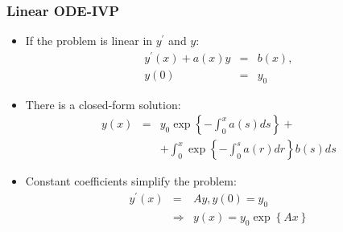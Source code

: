 \documentclass[bigger,handout]{beamer}
\begin{document}
\begin{frame}%
  
\frametitle{Linear ODE-IVP}

\begin{itemize}
\item If the problem is linear in $y^{\prime }$ and $y$:%
\begin{eqnarray*}
y^{\prime }\left( x\right) +a\left( x\right) y &=&b\left( x\right) , \\
y\left( 0\right) &=&y_{0}
\end{eqnarray*}

\item There is a closed-form solution:%
\begin{eqnarray*}
y\left( x\right) &=&y_{0}\exp \left\{ -\int_{0}^{x}a\left( s\right)
ds\right\} + \\
&&+\int_{0}^{x}\exp \left\{ -\int_{0}^{s}a\left( r\right) dr\right\} b\left(
s\right) ds
\end{eqnarray*}

\item Constant coefficients simplify the problem:%
\begin{eqnarray*}
y^{\prime }\left( x\right) &=&Ay,y\left( 0\right) =y_{0} \\
&\Rightarrow &y\left( x\right) =y_{0}\exp \left\{ Ax\right\}
\end{eqnarray*}
\end{itemize}

  
 
\end{frame}%
  
 
 
\end{document}

